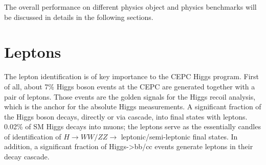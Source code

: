 The overall performance on different physics object and physics benchmarks will be discussed in details in the following sections. 




\section{Leptons}
The lepton identification is of key importance to the CEPC Higgs program.
First of all, about 7\% Higgs boson events at the CEPC are generated together with a pair of leptons.
Those events are the golden signals for the Higgs recoil analysis, which is the anchor for the absolute Higgs measurements.
A significant fraction of the Higgs boson decays,
directly or via cascade, into final states with leptons. 0.02\% of SM Higgs decays into muons;
the leptons serve as the essentially candles of identification of $H\to WW/ZZ\to$ leptonic/semi-leptonic final states.
In addition, a significant fraction of Higgs->bb/cc events generate leptons in their decay cascade. 

